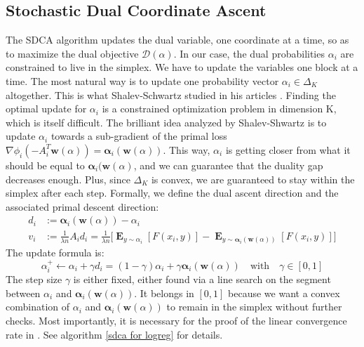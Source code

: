 \documentclass{article}
\DeclareMathOperator{\1}{\mathbb{1}}
\DeclareMathOperator{\E}{\mathbf{E}}
\begin{document}
\subsection{Stochastic Dual Coordinate Ascent}
The SDCA algorithm updates the dual variable, one coordinate at a time, so as to maximize the dual objective $\mathscr D(\alpha)$.
In our case, the dual probabilities $\alpha_i$ are constrained to live in the simplex.
We have to update the variables one block at a time.
The most natural way is to update one probability vector $\alpha_i \in \Delta_K$ altogether.
This is what Shalev-Schwartz studied in his articles \cite{shalev-shwartz_accelerated_2013-1}.
Finding the optimal update for $\alpha_i$ is a constrained optimization problem in dimension K, which is itself difficult. 
The brilliant idea analyzed by Shalev-Shwartz is to update $\alpha_i$ towards a sub-gradient of the primal loss $\nabla\phi_i( - A_i^T\bm w(\alpha)) = \bm \alpha_i(\bm w(\alpha))$.
This way, $\alpha_i$ is getting closer from what it should be equal to $\bm \alpha_i(\bm w(\alpha)$, and we can guarantee that the duality gap decreases enough.
Plus, since $\Delta_K$ is convex, we are guaranteed to stay within the simplex after each step.  
Formally, we define the dual ascent direction and the associated primal descent direction:
\begin{align*}
	d_i &:= \bm \alpha_i(\bm w(\alpha)) - \alpha_i \\
	v_i &:= \frac{1}{\lambda n} A_i d_i  = \frac{1}{\lambda n} \big [ \E_{y \sim \alpha_i} [F(x_i, y)] - \E_{y \sim  \bm \alpha_i(\bm w(\alpha)) } [F(x_i, y)] \big ]
\end{align*} 
The update formula is:
\begin{equation*}
	\alpha_i^+ \leftarrow \alpha_i + \gamma d_i = (1-\gamma)\alpha_i + \gamma \bm \alpha_i(\bm w(\alpha)) \quad \textrm{with} \quad \gamma \in [0,1]
\end{equation*}
The step size $\gamma$ is either fixed, either found via a line search on the segment between $\alpha_i$ and $\bm \alpha_i(\bm w(\alpha))$. 
It belongs in $[0,1]$ because we want a convex combination of $\alpha_i$ and $\bm \alpha_i(\bm w(\alpha))$ to remain in the simplex without further checks. 
Most importantly, it is necessary for the proof of the linear convergence rate in \cite{shalev-shwartz_accelerated_2013-1}. 
See algorithm \ref{sdca for logreg} for details.
\end{document}
